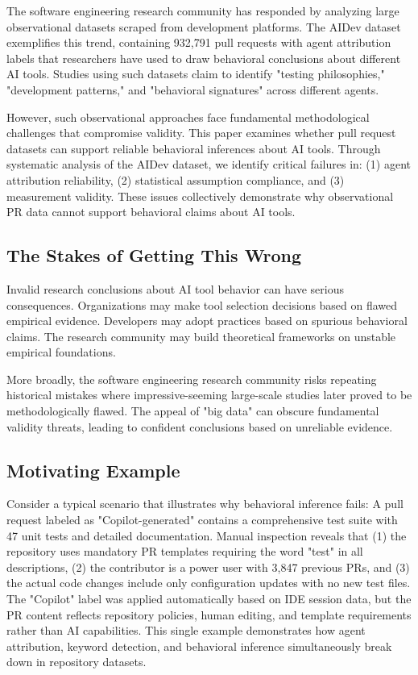 \documentclass[conference]{IEEEtran}
\begin{document}
The software engineering research community has responded by analyzing large observational datasets scraped from development platforms. The AIDev dataset exemplifies this trend, containing 932,791 pull requests with agent attribution labels that researchers have used to draw behavioral conclusions about different AI tools. Studies using such datasets claim to identify "testing philosophies," "development patterns," and "behavioral signatures" across different agents.

However, such observational approaches face fundamental methodological challenges that compromise validity. This paper examines whether pull request datasets can support reliable behavioral inferences about AI tools. Through systematic analysis of the AIDev dataset, we identify critical failures in: (1) agent attribution reliability, (2) statistical assumption compliance, and (3) measurement validity. These issues collectively demonstrate why observational PR data cannot support behavioral claims about AI tools.

\subsection{The Stakes of Getting This Wrong}

Invalid research conclusions about AI tool behavior can have serious consequences. Organizations may make tool selection decisions based on flawed empirical evidence. Developers may adopt practices based on spurious behavioral claims. The research community may build theoretical frameworks on unstable empirical foundations.

More broadly, the software engineering research community risks repeating historical mistakes where impressive-seeming large-scale studies later proved to be methodologically flawed. The appeal of "big data" can obscure fundamental validity threats, leading to confident conclusions based on unreliable evidence.

\subsection{Motivating Example}

Consider a typical scenario that illustrates why behavioral inference fails: A pull request labeled as "Copilot-generated" contains a comprehensive test suite with 47 unit tests and detailed documentation. Manual inspection reveals that (1) the repository uses mandatory PR templates requiring the word "test" in all descriptions, (2) the contributor is a power user with 3,847 previous PRs, and (3) the actual code changes include only configuration updates with no new test files. The "Copilot" label was applied automatically based on IDE session data, but the PR content reflects repository policies, human editing, and template requirements rather than AI capabilities. This single example demonstrates how agent attribution, keyword detection, and behavioral inference simultaneously break down in repository datasets.
\end{document}
